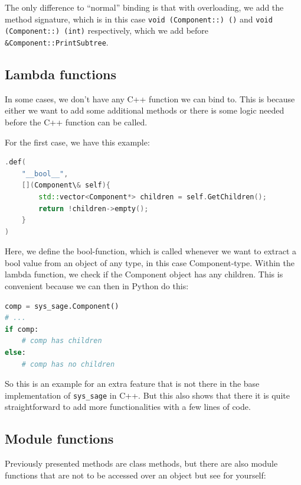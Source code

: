 The only difference to “normal” binding is that with overloading, we add the method signature, which is in this case \verb|void (Component::) ()| and \verb|void (Component::) (int)| respectively, which we add before \verb|&Component::PrintSubtree|. \cite[see The Basics/Object-Oriented Code]{pybind11-docu}


\subsection{Lambda functions}

In some cases, we don't have any C++ function we can bind to. This is because either we want to add some additional methods or there is some logic needed before the C++ function can be called.

For the first case, we have this example:
\newpage
\begin{lstlisting}[language=C++, xleftmargin=4em, frame = single]
.def(
    "__bool__",
    [](Component\& self){
        std::vector<Component*> children = self.GetChildren();
        return !children->empty();
    }
)
\end{lstlisting}

Here, we define the bool-function, which is called whenever we want to extract a bool value from an object of any type, in this case Component-type. Within the lambda function, we check if the Component object has any children. This is convenient because we can then in Python do this:

\begin{lstlisting}[language=Python,xleftmargin=4em, frame = single]
comp = sys_sage.Component()
# ...
if comp:
    # comp has children
else:
    # comp has no children
\end{lstlisting}

So this is an example for an extra feature that is not there in the base implementation of \verb|sys_sage| in C++. But this also shows that there it is quite straightforward to add more functionalities with a few lines of code.

\subsection{Module functions}

Previously presented methods are class methods, but there are also module functions that are not to be accessed over an object but see for yourself:

